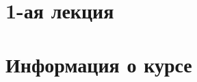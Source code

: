 
\maketitle
\tableofcontents

\newpage
\section{1-ая лекция}

\newpage
\section{Информация о курсе}
